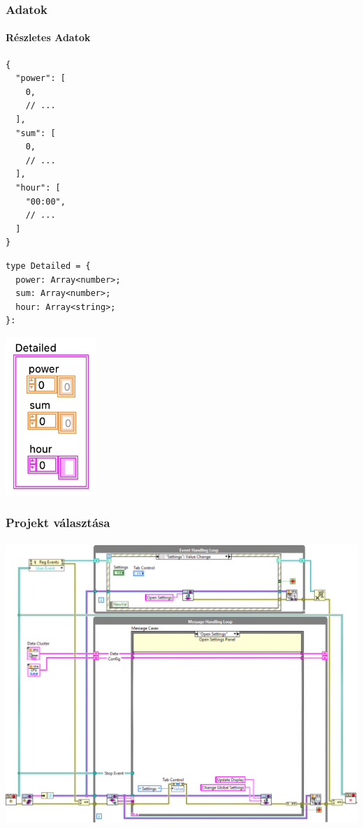 \documentclass{beamer}
\begin{document}
\begin{frame}[fragile]
  \frametitle{Adatok}
  \framesubtitle{Részletes Adatok}

  \begin{minipage}{.3\textwidth}
    \begin{verbatim}
{
  "power": [
    0,
    // ...
  ],
  "sum": [
    0,
    // ...
  ],
  "hour": [
    "00:00",
    // ...
  ]
}
    \end{verbatim}
  \end{minipage}\begin{minipage}{.45\textwidth}
    \begin{verbatim}
type Detailed = {
  power: Array<number>;
  sum: Array<number>;
  hour: Array<string>;
}:
    \end{verbatim}
  \end{minipage}\begin{minipage}{.25\textwidth}
    \flushright
    \includegraphics[height=6cm]{static/lv-detailed.png}
  \end{minipage}
\end{frame}

\begin{frame}
  \frametitle{Projekt választása}
  \framesubtitle{\;}

  \centering
  \includegraphics[height=.65\textwidth]{static/windows-bd.png}
\end{frame}
\end{document}
